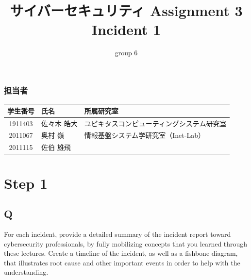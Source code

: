 \documentclass[uplatex]{jsarticle}
\title{
    \vspace{-1.5cm}
    サイバーセキュリティ Assignment 3 \\
    Incident 1
}
\author{group 6}
\begin{document}
\maketitle

\subsubsection*{担当者}
\begin{table}[H]
    \begin{tabular}{|c|l|l|}
        \hline
        学生番号 & 氏名 & 所属研究室\\
        \hline\hline
        1911403 & 佐々木 皓大 & ユビキタスコンピューティングシステム研究室\\
        \hline
        2011067 & 奥村 嶺 & 情報基盤システム学研究室（Inet-Lab）\\
        \hline
        2011115 & 佐伯 雄飛 & \\
        \hline
    \end{tabular}
\end{table}

\section*{Step 1}
\subsection*{Q}
For each incident, provide a detailed summary of the incident report toward cybersecurity professionals, by fully mobilizing concepts that you learned through these lectures. Create a timeline of the incident, as well as a fishbone diagram, that illustrates root cause and other important events in order to help with the understanding.
\end{document}

